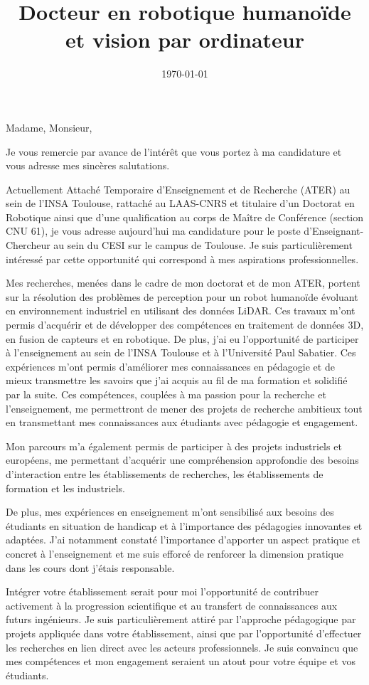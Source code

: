 \documentclass[10pt, a4paper, roman]{moderncv}        %
\title{Docteur en robotique humano\"ide et vision par ordinateur}            %
\begin{document}
\date{\today}
\opening{Madame, Monsieur,}
\closing{Je vous remercie par avance de l'intérêt que vous portez à ma candidature et vous adresse mes sincères salutations.}
\makelettertitle
\justifying
Actuellement Attaché Temporaire d'Enseignement et de Recherche (ATER) au sein de l'INSA Toulouse, rattaché au LAAS-CNRS et titulaire d'un Doctorat en Robotique ainsi que d'une qualification au corps de Maître de Conférence (section CNU 61), je vous adresse aujourd'hui ma candidature pour le poste d'Enseignant-Chercheur au sein du CESI sur le campus de Toulouse. Je suis particulièrement intéressé par cette opportunité qui correspond à mes aspirations professionnelles.

Mes recherches, menées dans le cadre de mon doctorat et de mon ATER, portent sur la résolution des problèmes de perception pour un robot humanoïde évoluant en environnement industriel en utilisant des données LiDAR. Ces travaux m'ont permis d'acquérir et de développer des compétences en traitement de données 3D, en fusion de capteurs et en robotique. De plus, j'ai eu l'opportunité de participer à l'enseignement au sein de l'INSA Toulouse et à l'Université Paul Sabatier. Ces expériences m'ont permis d'améliorer mes connaissances en pédagogie et de mieux transmettre les savoirs que j'ai acquis au fil de ma formation et solidifié par la suite. Ces compétences, couplées à ma passion pour la recherche et l'enseignement, me permettront de mener des projets de recherche ambitieux tout en transmettant mes connaissances aux étudiants avec pédagogie et engagement.

Mon parcours m'a également permis de participer à des projets industriels et européens, me permettant d'acquérir une compréhension approfondie des besoins d'interaction entre les établissements de recherches, les établissements de formation et les industriels.

De plus, mes expériences en enseignement m'ont sensibilisé aux besoins des étudiants en situation de handicap et à l'importance des pédagogies innovantes et adaptées. J'ai notamment constaté l'importance d'apporter un aspect pratique et concret à l'enseignement et me suis efforcé de renforcer la dimension pratique dans les cours dont j'étais responsable.

Intégrer votre établissement serait pour moi l'opportunité de contribuer activement à la progression scientifique et au transfert de connaissances aux futurs ingénieurs. Je suis particulièrement attiré par l'approche pédagogique par projets appliquée dans votre établissement, ainsi que par l'opportunité d'effectuer les recherches en lien direct avec les acteurs professionnels. Je suis convaincu que mes compétences et mon engagement seraient un atout pour votre équipe et vos étudiants.

\vspace{0.5cm}


\makeletterclosing
\end{document}
